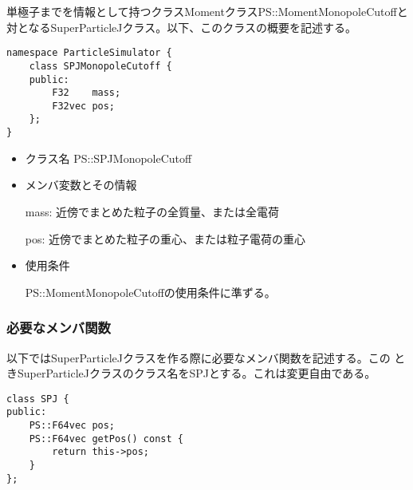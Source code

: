 

単極子までを情報として持つクラスMomentクラスPS::MomentMonopoleCutoffと
対となるSuperParticleJクラス。以下、このクラスの概要を記述する。
\begin{screen}
\begin{verbatim}
namespace ParticleSimulator {
    class SPJMonopoleCutoff {
    public:
        F32    mass;
        F32vec pos;
    };
}
\end{verbatim}
\end{screen}

\begin{itemize}
\item クラス名
  PS::SPJMonopoleCutoff

\item メンバ変数とその情報

  mass: 近傍でまとめた粒子の全質量、または全電荷

  pos: 近傍でまとめた粒子の重心、または粒子電荷の重心

\item 使用条件

  PS::MomentMonopoleCutoffの使用条件に準ずる。

\end{itemize}

\subsubsection{必要なメンバ関数}


以下ではSuperParticleJクラスを作る際に必要なメンバ関数を記述する。この
ときSuperParticleJクラスのクラス名をSPJとする。これは変更自由である。


\begin{screen}
\begin{verbatim}
class SPJ {
public:
    PS::F64vec pos;
    PS::F64vec getPos() const {
        return this->pos;
    }
};
\end{verbatim}
\end{screen}

